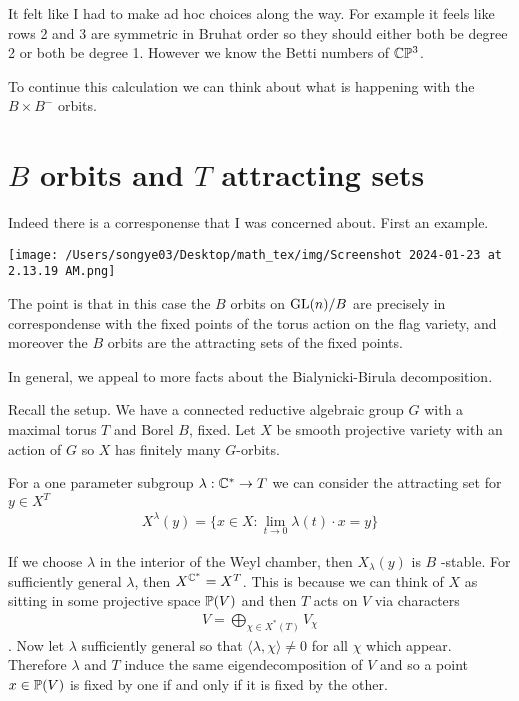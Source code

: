\documentclass[12pt]{article}
\begin{document}
It felt like I had to make ad hoc choices along the way. For example it feels like rows 2 and 3 are symmetric in Bruhat order 
so they should either both be degree 2 or both be degree 1. However we know the Betti numbers of $\C\P^3$.
\hfill

To continue this calculation we can think about what is happening with the $B\times B^-$ orbits. 

\section{$B$ orbits and $T$ attracting sets}
Indeed there is a corresponense that I was concerned about. First an example.

\begin{example}[Allen]
    \begin{center}
        \texttt{[image: /Users/songye03/Desktop/math\_tex/img/Screenshot 2024-01-23 at 2.13.19 AM.png]}
    \end{center}
    The point is that in this case the $B$ orbits on $\GL(n)/B$ are precisely in correspondense with the fixed points
    of the torus action on the flag variety, and moreover the $B$ orbits are the attracting sets of the fixed points.
\end{example}
   
In general, we appeal to more facts about the Bialynicki-Birula decomposition.

\hfill

Recall the setup. We have a connected reductive algebraic group $G$ with a maximal torus $T$ and Borel $B$, fixed.
Let $X$ be smooth projective variety with an action of $G$ so $X$ has finitely many $G$-orbits.

\hfill

For a one parameter subgroup $\lambda: \C^*\to T$ we can consider the attracting set for $y\in X^T$ \begin{align*}
    X^\lambda(y) = \{x\in X: \lim_{t\to 0} \lambda(t)\cdot x = y\}
\end{align*} 

\hfill

If we choose $\lambda$ in the interior of the Weyl chamber, then $X_\lambda(y)$ is $B$
-stable. For sufficiently general $\lambda$, then $X^{\C^*} = X^T$. This is because we can think of $X$
as sitting in some projective space $\P(V)$ and then $T$ acts on $V$ via characters \begin{align*}
    V = \bigoplus_{\chi\in X^*(T)} V_\chi
\end{align*}. Now let $\lambda$ sufficiently general so that $\langle \lambda, \chi\rangle \neq 0$ for all $\chi$
which appear. Therefore $\lambda$ and $T$ induce the same eigendecomposition of $V$ and so a point $x\in \P(V)$
is fixed by one if and only if it is fixed by the other.
\end{document}
